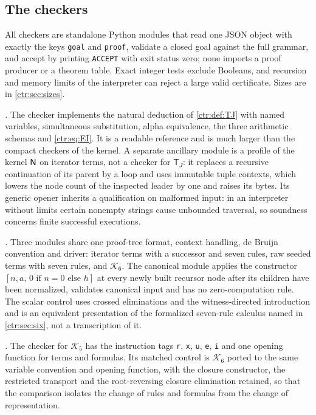 \subsection{The checkers}

All checkers are standalone Python modules that read one JSON object with exactly the keys
\texttt{goal} and \texttt{proof}, validate a closed goal against the full grammar, and
accept by printing \texttt{ACCEPT} with exit status zero; none imports a proof producer or a
theorem table. Exact integer tests exclude Booleans, and recursion and memory limits of the
interpreter can reject a large valid certificate. Sizes are in \cref{ctr:sec:sizes}.

\emph{.} The checker implements the natural deduction of
\cref{ctr:def:TJ} with named variables, simultaneous substitution, alpha equivalence, the
three arithmetic schemas and \eqref{ctr:eq:EI}. It is a readable reference and is much
larger than the compact checkers of the kernel. A separate ancillary module is a profile
of the kernel $\mathsf{N}$ on iterator terms, not a checker for $\mathsf T_J$: it replaces a
recursive continuation of its parent by a loop and uses immutable tuple contexts, which
lowers the node count of the inspected leader by one and raises its bytes. Its generic
opener inherits a qualification on malformed input: in an interpreter without limits
certain nonempty strings cause unbounded traversal, so soundness concerns finite successful
executions.

\emph{.} Three modules share one proof-tree format, context
handling, de Bruijn convention and driver: iterator terms with a successor and seven rules,
raw seeded terms with seven rules, and $\mathcal K_6$. The canonical module applies the
constructor $[n,a,\,0 \text{ if } n=0 \text{ else } h]$ at every newly built recursor node
after its children have been normalized, validates canonical input and has no
zero-computation rule. The scalar control uses crossed eliminations and the
witness-directed introduction and is an equivalent presentation of the formalized seven-rule
calculus named in \cref{ctr:sec:six}, not a transcription of it.

\emph{.} The checker for $\mathcal K_5$ has the instruction tags
\texttt{r}, \texttt{x}, \texttt{u}, \texttt{e}, \texttt{i} and one opening function for
terms and formulas. Its matched control is $\mathcal K_6$ ported to the same variable
convention and opening function, with the closure constructor, the restricted transport and
the root-reversing closure elimination retained, so that the comparison isolates the change
of rules and formulas from the change of representation.

